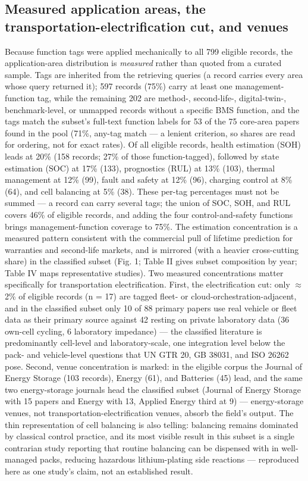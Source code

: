 \documentclass[journal]{IEEEtran}
\begin{document}
\subsection{Measured application areas, the transportation-electrification cut, and venues}

Because function tags were applied mechanically to all 799 eligible records, the application-area distribution is \textit{measured} rather than quoted from a curated sample. Tags are inherited from the retrieving queries (a record carries every area whose query returned it); 597 records (75\%) carry at least one management-function tag, while the remaining 202 are method-, second-life-, digital-twin-, benchmark-level, or unmapped records without a specific BMS function, and the tags match the subset's full-text function labels for 53 of the 75 core-area papers found in the pool (71\%, any-tag match --- a lenient criterion, so shares are read for ordering, not for exact rates). Of all eligible records, health estimation (SOH) leads at 20\% (158 records; 27\% of those function-tagged), followed by state estimation (SOC) at 17\% (133), prognostics (RUL) at 13\% (103), thermal management at 12\% (99), fault and safety at 12\% (96), charging control at 8\% (64), and cell balancing at 5\% (38). These per-tag percentages must not be summed --- a record can carry several tags; the union of SOC, SOH, and RUL covers 46\% of eligible records, and adding the four control-and-safety functions brings management-function coverage to 75\%. The estimation concentration is a measured pattern consistent with the commercial pull of lifetime prediction for warranties and second-life markets, and is mirrored (with a heavier cross-cutting share) in the classified subset (Fig. 1; Table II gives subset composition by year; Table IV maps representative studies). Two measured concentrations matter specifically for transportation electrification. First, the electrification cut: only $\approx$2\% of eligible records (n = 17) are tagged fleet- or cloud-orchestration-adjacent, and in the classified subset only 10 of 88 primary papers use real vehicle or fleet data as their primary source against 42 resting on private laboratory data (36 own-cell cycling, 6 laboratory impedance) --- the classified literature is predominantly cell-level and laboratory-scale, one integration level below the pack- and vehicle-level questions that UN GTR 20, GB 38031, and ISO 26262 pose. Second, venue concentration is marked: in the eligible corpus the Journal of Energy Storage (103 records), Energy (61), and Batteries (45) lead, and the same two energy-storage journals head the classified subset (Journal of Energy Storage with 15 papers and Energy with 13, Applied Energy third at 9) --- energy-storage venues, not transportation-electrification venues, absorb the field's output. The thin representation of cell balancing is also telling: balancing remains dominated by classical control practice, and its most visible result in this subset is a single contrarian study reporting that routine balancing can be dispensed with in well-managed packs, reducing hazardous lithium-plating side reactions \cite{r30} --- reproduced here as one study's claim, not an established result.
\end{document}
